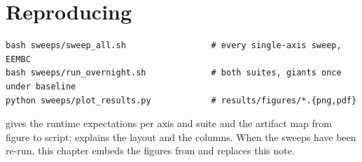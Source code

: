 \section{Reproducing}

\begin{lstlisting}[style=shell]
bash sweeps/sweep_all.sh                 # every single-axis sweep, EEMBC
bash sweeps/run_overnight.sh             # both suites, giants once under baseline
python sweeps/plot_results.py            # results/figures/*.{png,pdf}
\end{lstlisting}

 gives the runtime expectations per axis and suite and the artifact
map from figure to script;  explains the layout and the columns. When
the sweeps have been re-run, this chapter embeds the figures from  and
replaces this note.
